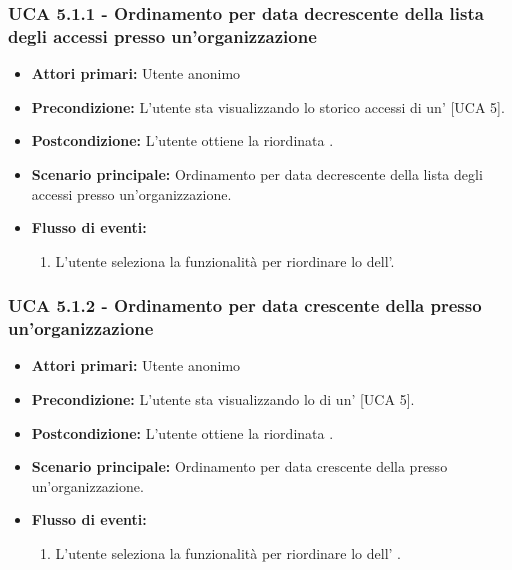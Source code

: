 \subsubsection{UCA 5.1.1 - Ordinamento per data decrescente della lista degli accessi presso un'organizzazione}
\begin{itemize}
	\item \textbf{Attori primari:} Utente anonimo
	\item \textbf{Precondizione:} L'utente sta visualizzando lo storico accessi di un' [UCA 5].
	\item \textbf{Postcondizione:} L'utente ottiene la  riordinata .
	\item \textbf{Scenario principale:} Ordinamento per data decrescente della lista degli accessi presso un'organizzazione.
	\item \textbf{Flusso di eventi:}
	\begin{enumerate}
		\item L'utente seleziona la funzionalità per riordinare lo  dell'.
	\end{enumerate}   
\end{itemize}

\subsubsection{UCA 5.1.2 - Ordinamento per data crescente della  presso un'organizzazione}
\begin{itemize}
	\item \textbf{Attori primari:} Utente anonimo
	\item \textbf{Precondizione:} L'utente sta visualizzando lo  di un' [UCA 5].
	\item \textbf{Postcondizione:} L'utente ottiene la  riordinata .
	\item \textbf{Scenario principale:} Ordinamento per data crescente della  presso un'organizzazione.
	\item \textbf{Flusso di eventi:}
	\begin{enumerate}
		\item L'utente seleziona la funzionalità per riordinare lo  dell' .
	\end{enumerate}
\end{itemize}

